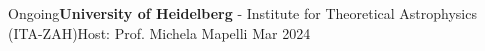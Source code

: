 %
%
%
\begin{experiences}
  \visiting
    {Ongoing}{\textbf{University of Heidelberg} - Institute for Theoretical Astrophysics (ITA-ZAH)}{Host: Prof. Michela Mapelli }
    {Mar 2024}
\end{experiences}
